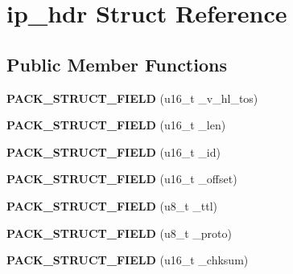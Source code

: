 \hypertarget{structip__hdr}{}\section{ip\+\_\+hdr Struct Reference}
\label{structip__hdr}
\subsection*{Public Member Functions}
\begin{DoxyCompactItemize}
\item 
\hypertarget{structip__hdr_a10524f0bebe44c882756c05e67ad9bfd}{}{\bfseries P\+A\+C\+K\+\_\+\+S\+T\+R\+U\+C\+T\+\_\+\+F\+I\+E\+L\+D} (u16\+\_\+t \+\_\+v\+\_\+hl\+\_\+tos)\label{structip__hdr_a10524f0bebe44c882756c05e67ad9bfd}

\item 
\hypertarget{structip__hdr_aa3905f2613b3ce0994d3a04cf22ce2d7}{}{\bfseries P\+A\+C\+K\+\_\+\+S\+T\+R\+U\+C\+T\+\_\+\+F\+I\+E\+L\+D} (u16\+\_\+t \+\_\+len)\label{structip__hdr_aa3905f2613b3ce0994d3a04cf22ce2d7}

\item 
\hypertarget{structip__hdr_a6d3aca5e6bdd354c377836c67d93575b}{}{\bfseries P\+A\+C\+K\+\_\+\+S\+T\+R\+U\+C\+T\+\_\+\+F\+I\+E\+L\+D} (u16\+\_\+t \+\_\+id)\label{structip__hdr_a6d3aca5e6bdd354c377836c67d93575b}

\item 
\hypertarget{structip__hdr_a2c93d9f414cb5e3bd727799393b3688a}{}{\bfseries P\+A\+C\+K\+\_\+\+S\+T\+R\+U\+C\+T\+\_\+\+F\+I\+E\+L\+D} (u16\+\_\+t \+\_\+offset)\label{structip__hdr_a2c93d9f414cb5e3bd727799393b3688a}

\item 
\hypertarget{structip__hdr_a0d402789ed4488b5538e276b117bfbd1}{}{\bfseries P\+A\+C\+K\+\_\+\+S\+T\+R\+U\+C\+T\+\_\+\+F\+I\+E\+L\+D} (u8\+\_\+t \+\_\+ttl)\label{structip__hdr_a0d402789ed4488b5538e276b117bfbd1}

\item 
\hypertarget{structip__hdr_a4fb16bde7f441a14cc673fe12289153f}{}{\bfseries P\+A\+C\+K\+\_\+\+S\+T\+R\+U\+C\+T\+\_\+\+F\+I\+E\+L\+D} (u8\+\_\+t \+\_\+proto)\label{structip__hdr_a4fb16bde7f441a14cc673fe12289153f}

\item 
\hypertarget{structip__hdr_a620275dbd7f7b8f02cf3f90fa035eb62}{}{\bfseries P\+A\+C\+K\+\_\+\+S\+T\+R\+U\+C\+T\+\_\+\+F\+I\+E\+L\+D} (u16\+\_\+t \+\_\+chksum)\label{structip__hdr_a620275dbd7f7b8f02cf3f90fa035eb62}


\end{DoxyCompactItemize}
